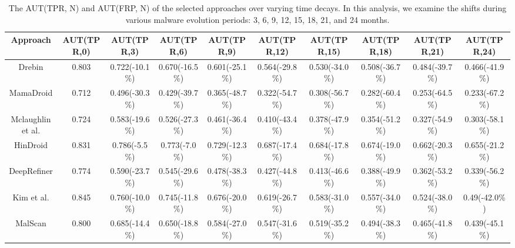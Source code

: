 \begin{table}[t]
    \centering
    \renewcommand{\arraystretch}{1.1}
    \caption{The AUT(TPR, N) and AUT(FRP, N) of the selected approaches over varying time decays. In this analysis, we examine the shifts during various malware evolution periods: 3, 6, 9, 12, 15, 18, 21, and 24 months.}
    \vspace{-0.1cm}
    \begin{adjustbox}{width=\textwidth}
        \begin{tabular}{@{}c|c|c|c|c|c|c|c|c|c@{}}
            \toprule
            \textbf{Approach}         & \textbf{AUT(TPR,0)} & \textbf{AUT(TPR,3)} & \textbf{AUT(TPR,6)} & \textbf{AUT(TPR,9)} & \textbf{AUT(TPR,12)} & \textbf{AUT(TPR,15)} & \textbf{AUT(TPR,18)} & \textbf{AUT(TPR,21)} & \textbf{AUT(TPR,24)} \\ \midrule
            Drebin            & 0.803               & 0.722(-10.1\%)      & 0.670(-16.5\%)      & 0.601(-25.1\%)      & 0.564(-29.8\%)       & 0.530(-34.0\%)       & 0.508(-36.7\%)       & 0.484(-39.7\%)       & 0.466(-41.9\%)       \\ \midrule
            MamaDroid         & 0.712               & 0.496(-30.3\%)      & 0.429(-39.7\%)      & 0.365(-48.7\%)      & 0.322(-54.7\%)       & 0.308(-56.7\%)       & 0.282(-60.4\%)       & 0.253(-64.5\%)       & 0.233(-67.2\%)       \\ \midrule
            Mclaughlin et al. & 0.724               & 0.583(-19.6\%)      & 0.526(-27.3\%)      & 0.461(-36.4\%)      & 0.410(-43.4\%)       & 0.378(-47.9\%)       & 0.354(-51.2\%)       & 0.327(-54.9\%)       & 0.303(-58.1\%)       \\ \midrule
            HinDroid          & 0.831               & 0.786(-5.5\%)       & 0.773(-7.0\%)       & 0.729(-12.3\%)      & 0.687(-17.4\%)       & 0.684(-17.8\%)       & 0.674(-19.0\%)       & 0.662(-20.3\%)       & 0.655(-21.2\%)       \\ \midrule
            DeepRefiner       & 0.774               & 0.590(-23.7\%)      & 0.545(-29.6\%)      & 0.478(-38.3\%)      & 0.427(-44.8\%)       & 0.413(-46.6\%)       & 0.388(-49.9\%)       & 0.362(-53.2\%)       & 0.339(-56.2\%)       \\ \midrule
            Kim et al.        & 0.845               & 0.760(-10.0\%)      & 0.745(-11.8\%)      & 0.676(-20.0\%)      & 0.619(-26.7\%)       & 0.583(-31.0\%)       & 0.557(-34.0\%)       & 0.524(-38.0\%)       & 0.49(-42.0\%)        \\ \midrule
            MalScan           & 0.800               & 0.685(-14.4\%)      & 0.650(-18.8\%)      & 0.584(-27.0\%)      & 0.547(-31.6\%)       & 0.519(-35.2\%)       & 0.494(-38.3\%)       & 0.465(-41.8\%)       & 0.439(-45.1\%)       \\ \midrule

\end{tabular}
\end{adjustbox}
\end{table}
